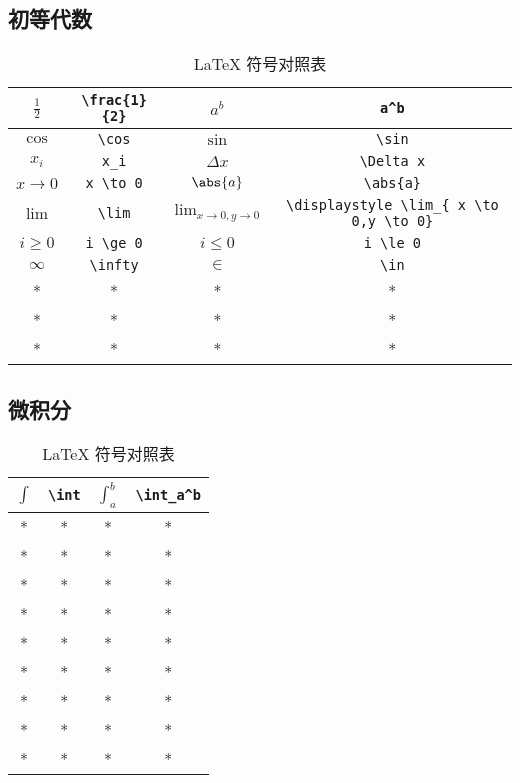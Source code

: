 
\subsection{初等代数}
\begin{table}[ht]
\centering
\caption{LaTeX 符号对照表}\label{tab_TeXSym0}
\begin{tabular}{|c|c|c|c|}
\hline
$\frac{1}{2}$ & \verb|\frac{1}{2}| & $a^b$ & \verb|a^b| \\
\hline
$\cos$ & \verb|\cos| & $\sin$ & \verb|\sin| \\
\hline
$x_i$ & \verb|x_i| & $\Delta x$& \verb|\Delta x| \\
\hline
$x \to 0$ & \verb|x \to 0| & $\abs{a}$ & \verb|\abs{a}| \\
\hline
$\lim$ & \verb|\lim| & $\displaystyle \lim_{ x \to 0,y \to 0}$ & \verb|\displaystyle \lim_{ x \to 0,y \to 0}| \\
\hline
$i \ge 0$& \verb|i \ge 0| & $i \le 0$ & \verb|i \le 0| \\
\hline
$\infty$ & \verb|\infty| & $\in$ & \verb|\in| \\
\hline
* & * & * & * \\
\hline
* & * & * & * \\
\hline
* & * & * & * \\
\hline
\end{tabular}
\end{table}


\subsection{微积分}
\begin{table}[ht]
\centering
\caption{LaTeX 符号对照表}\label{tab_TeXSym1}
\begin{tabular}{|c|c|c|c|}
\hline
$\int$ & \verb|\int| & $\int_a^b$ & \verb|\int_a^b| \\
\hline
* & * & * & * \\
\hline
* & * & * & * \\
\hline
* & * & * & * \\
\hline
* & * & * & * \\
\hline
* & * & * & * \\
\hline
* & * & * & * \\
\hline
* & * & * & * \\
\hline
* & * & * & * \\
\hline
* & * & * & * \\
\hline
\end{tabular}
\end{table}
